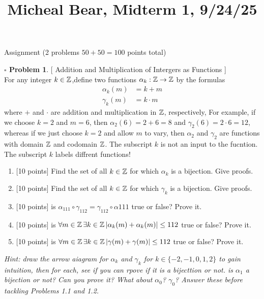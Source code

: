\documentclass[11pt,twoside]{amsart}
\title {Micheal Bear, Midterm 1, 9/24/25}
\theoremstyle{definition}
\newtheorem{bprob}{$\square$ Problem}
\begin{document}
	\maketitle	

Assignment (2 problems $50 + 50 = 100$ points total)

\begin{bprob} %
  {[ Addition and Multiplication of Intergers as Functions ]} \\
  For any integer $k \in \operatorname*{\mathbb{Z}}$,define two functions $\alpha_k: \operatorname*{\mathbb{Z}} \to \operatorname*{\mathbb{Z}}$ by the formulas 
    \begin{align*}
      \alpha_k(m) &= k + m \\
      \gamma_k(m) &= k \cdot m
    \end{align*}
 where $+$ and $\cdot$ are addition and multiplication in $\operatorname*{\mathbb{Z}}$, respectively, For example, if we choose $k = 2$ and $m = 6$, then $\alpha_2(6) = 2+6=8$ and $\gamma_2(6) = 2 \cdot 6 = 12$, whereas if we just choose $k = 2$ and allow $m$ to vary, then $\alpha_2$ and $\gamma_2$ are functions with domain $\operatorname*{\mathbb{Z}}$ and codomain $\operatorname*{\mathbb{Z}}$. The subscript $k$ is not an input to the fucntion. The subscript $k$ labels diffrent functions!
    \begin{enumerate}[label= 1.\arabic*, itemsep=0.1cm]
        \item %
          {[10 points]} Find the set of all $k \in \operatorname*{\mathbb{Z}}$ for which $\alpha_k$ is a bijection. Give proofs.
        \item %
          {[10 points]} Find the set of all $k \in \operatorname*{\mathbb{Z}}$ for which $\gamma_k$ is a bijection. Give proofs.
        \item %
          {[10 points]} is $\alpha_{111} \circ \gamma_{112} = \gamma_{112} \circ \alpha{111}$ true or false? Prove it.
        \item %
          {[10 points]} is $\forall m \in \operatorname*{\mathbb{Z}} \exists k \in \operatorname*{\mathbb{Z}} | \alpha_k(m) + \alpha_k(m)| \leq 112$ true or false? Prove it.
        \item %
          {[10 points]} is $\forall m \in \operatorname*{\mathbb{Z}} \exists k \in \operatorname*{\mathbb{Z}} | \gamma(m) + \gamma(m)| \leq 112$ true or false? Prove it.

    \end{enumerate}
\end{bprob}
\textit{Hint: draw the arrow aiagram for $\alpha_k$ and $\gamma_k$ for $k \in \{ -2, -1, 0, 1, 2 \}$ to gain intuition, then for each, see if you can rpove if it is a bijecttion or not. is $\alpha_1$ a bijection or not? Can you prove it? What about $\alpha_0$? $\gamma_0$? Answer these before tackling Problems 1.1 and 1.2.} \medskip \\
\end{document}
